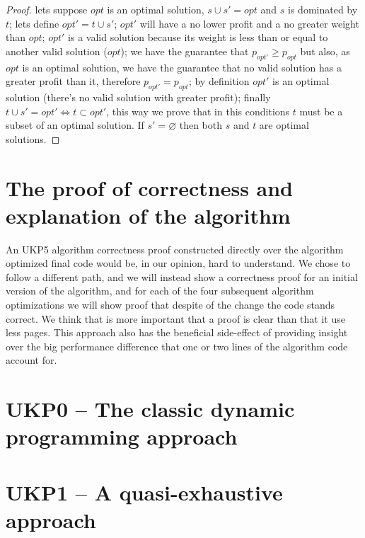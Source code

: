 \documentclass[12pt]{article}
\begin{document}
\begin{proof}
lets suppose \(opt\) is an optimal solution, \(s \cup s' = opt\) and \(s\) is dominated by \(t\); lets define \(opt' = t \cup s'\); \(opt'\) will have a no lower profit and a no greater weight than \(opt\); \(opt'\) is a valid solution because its weight is less than or equal to another valid solution (\(opt\)); we have the guarantee that \(p_{opt'} \geq p_{opt}\) but also, as \(opt\) is an optimal solution, we have the guarantee that no valid solution has a greater profit than it, therefore \(p_{opt'} = p_{opt}\); by definition \(opt'\) is an optimal solution (there's no valid solution with greater profit); finally \(t \cup s' = opt' \iff t \subset opt'\), this way we prove that in this conditions \(t\) must be a subset of an optimal solution. If \(s' = \varnothing\) then both \(s\) and \(t\) are optimal solutions.
\end{proof}

\section{The proof of correctness and explanation of the algorithm}

An UKP5 algorithm correctness proof constructed directly over the algorithm optimized final code would be, in our opinion, hard to understand. We chose to follow a different path, and we will instead show a correctness proof for an initial version of the algorithm, and for each of the four subsequent algorithm optimizations we will show proof that despite of the change the code stands correct. We think that is more important that a proof is clear than that it use less pages. This approach also has the beneficial side-effect of providing insight over the big performance difference that one or two lines of the algorithm code account for.

\section{UKP0 -- The classic dynamic programming approach}

\section{UKP1 -- A quasi-exhaustive approach}
\end{document}
